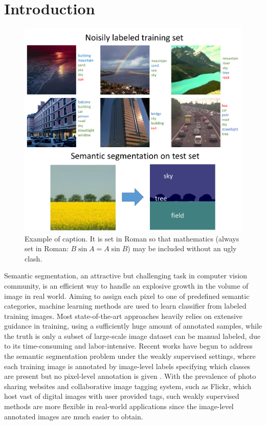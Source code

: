 \section{Introduction}

\begin{figure}[t]
	\begin{center}
   		\includegraphics[width=0.95\linewidth]{noisyparsing.pdf}
	\end{center}
   \caption{Example of caption.  It is set in Roman so that mathematics
   (always set in Roman: $B \sin A = A \sin B$) may be included without an
   ugly clash.}
\label{fig:noisyparsing}
\end{figure}

Semantic segmentation, an attractive but challenging task in computer vision community, is an efficient way to handle an explosive growth in the volume of image in real world. Aiming to assign each pixel to one of predefined semantic categories, machine learning methods are used to learn classifier from labeled training images. Most state-of-the-art approaches heavily relies on extensive guidance in training, using a sufficiently huge amount of annotated samples, while the truth is only a subset of large-scale image dataset can be manual labeled, due to its time-consuming and labor-intensive. Recent works have begun to address the semantic segmentation problem under the weakly supervised settings, where each training image is annotated by image-level labels specifying which classes are present but no pixel-level annotation is given \cite{verbeek2007region,vezhnevets2010towards,vezhnevets2011weakly,vezhnevets2012weakly,xu2014tell,zhang2013sparse,zhang2013probabilistic}. With the prevalence of photo sharing websites and collaborative image tagging system, such as Flickr, which host vast of digital images with user provided tags, such weakly supervised methods are more flexible in real-world applications since the image-level annotated images are much easier to obtain.

